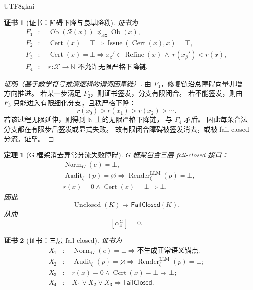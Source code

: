 \documentclass[12pt]{article}
\newtheorem{theorem}{定理}[section]
\newtheorem{Certificate}{证书}[section]
\newcommand{\NN}{\mathbb{N}}
\newcommand{\FailClosed}{\mathsf{FailClosed}}
\newcommand{\Cert}{\operatorname{Cert}}
\newcommand{\Norm}{\operatorname{Norm}}
\newcommand{\Render}{\operatorname{Render}}
\newcommand{\Audit}{\operatorname{Audit}}
\newcommand{\Issue}{\operatorname{Issue}}
\newcommand{\Refine}{\operatorname{Refine}}
\begin{document}
\begin{CJK*}{UTF8}{gkai}
\begin{Certificate}[证书：障碍下降与良基降秩]
\label{cert:tex51-g-finite-closure}
证书为
\[
\begin{aligned}
  F_1&:\quad \operatorname{Ob}(\mathcal R(x))\preceq_{\mathrm{lex}}\operatorname{Ob}(x),\\
  F_2&:\quad \Cert(x)=\top\Rightarrow\Issue(\Cert(x),x)=\top,\\
  F_3&:\quad \Cert(x)=\bot\Rightarrow x_\beta'\in\Refine(x)\ \wedge\ r(x_\beta')<r(x),\\
  F_4&:\quad r:\mathcal X\to\NN\text{ 不允许无限严格下降链}.
\end{aligned}
\]
\end{Certificate}

\begin{proof}[证明（基于数学符号推演逻辑的谓词因果链）]
由 \(F_1\)，修复链沿总障碍向量非增方向推进。
若某一步满足 \(F_2\)，则证书签发，分支有限闭合。
若不能签发，则由 \(F_3\) 只能进入有限细化分支，且秩严格下降：
\[
  r(x_0)>r(x_1)>r(x_2)>\cdots.
\]
若该过程无限延伸，则得到 \(\NN\) 上的无限严格下降链，
与 \(F_4\) 矛盾。
因此每条合法分支都在有限步后签发或显式失败。
故有限闭合障碍被签发消去，或被 fail-closed 分流。证毕。
\end{proof}

\begin{theorem}[G 框架消去异常分流失败障碍]
\label{thm:tex51-g-failclosed}
G 框架包含三层 fail-closed 接口：
\[
\begin{aligned}
  &\Norm_G(e)=\bot,\\
  &\Audit_\xi(p)=\varnothing\Rightarrow \Render_\xi^{\mathrm{LLM}}(p)=\bot,\\
  &r(x)=0\wedge\Cert(x)=\bot\Rightarrow \bot.
\end{aligned}
\]
因此
\[
  \operatorname{Unclosed}(K)\Rightarrow\FailClosed(K),
\]
从而
\[
  [\alpha_4^G]=0.
\]
\end{theorem}

\begin{Certificate}[证书：三层 fail-closed]
\label{cert:tex51-g-failclosed}
证书为
\[
\begin{aligned}
  X_1&:\quad \Norm_G(e)=\bot\Rightarrow \text{不生成正常语义锚点};\\
  X_2&:\quad \Audit_\xi(p)=\varnothing\Rightarrow \Render_\xi^{\mathrm{LLM}}(p)=\bot;\\
  X_3&:\quad r(x)=0\wedge\Cert(x)=\bot\Rightarrow \bot;\\
  X_4&:\quad X_1\vee X_2\vee X_3\Rightarrow \FailClosed.
\end{aligned}
\]
\end{Certificate}


\end{CJK*}
\end{document}
